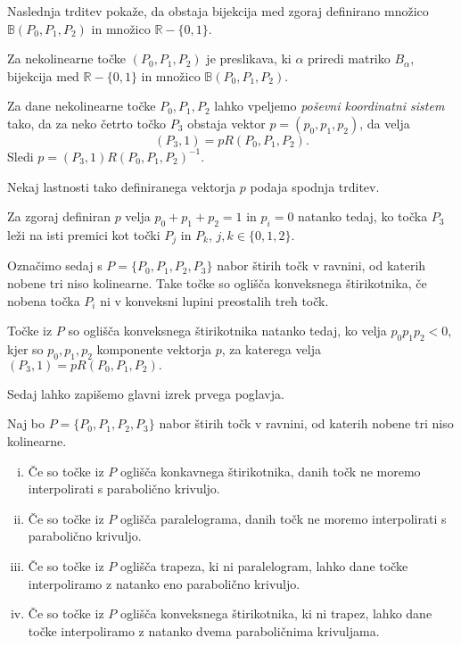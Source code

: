 \documentclass[mat1]{fmfdelo}
\newcommand{\R}{\mathbb R}
\newcommand{\B}{\mathbb B}
\newcommand{\al}{\alpha}
\begin{document}
Naslednja trditev pokaže, da obstaja bijekcija med zgoraj definirano množico $\B(P_0, P_1, P_2)$ in množico $\R - \{0, 1\}$.

\begin{trditev}
Za nekolinearne točke $(P_0, P_1, P_2)$ je preslikava, ki $\al$ priredi matriko $B_{\al}$, bijekcija med $\R - \{0, 1\}$ in množico $\B(P_0, P_1, P_2)$.
\end{trditev}

Za dane nekolinearne točke $P_0, P_1, P_2$ lahko vpeljemo \emph{poševni koordinatni sistem} tako, da za neko četrto točko $P_3$ obstaja vektor $p = (p_0, p_1, p_2)$, da velja
$$(P_3, 1) = p R(P_0, P_1, P_2).$$ Sledi $ p = (P_3, 1) R(P_0, P_1, P_2)^{-1}$.

Nekaj lastnosti tako definiranega vektorja $p$ podaja spodnja trditev.

\begin{trditev}
Za zgoraj definiran $p$ velja $p_0 + p_1 + p_2 = 1$ in $p_i = 0$ natanko tedaj, ko točka $P_3$ leži na isti premici kot točki $P_j$ in $P_k$, $j, k \in \{0, 1, 2 \}$. 
\end{trditev}

Označimo sedaj s $P = \{ P_0, P_1, P_2, P_3 \}$ nabor štirih točk v ravnini, od katerih nobene tri niso kolinearne. Take točke so oglišča konveksnega štirikotnika, če nobena točka $P_i$ ni v konveksni lupini preostalih treh točk.

\begin{trditev}
Točke iz $P$ so oglišča konveksnega štirikotnika natanko tedaj, ko velja $p_0 p_1 p_2 < 0$, kjer so $p_0, p_1, p_2$ komponente vektorja $p$, za katerega velja $(P_3, 1) = p R(P_0, P_1, P_2).$
\end{trditev}

Sedaj lahko zapišemo glavni izrek prvega poglavja.

\begin{izrek}
Naj bo $P = \{ P_0, P_1, P_2, P_3 \}$ nabor štirih točk v ravnini, od katerih nobene tri niso kolinearne.

\begin{enumerate}[i)]

\item Če so točke iz $P$ oglišča konkavnega štirikotnika, danih točk ne moremo interpolirati s parabolično krivuljo.

\item Če so točke iz $P$ oglišča paralelograma, danih točk ne moremo interpolirati s parabolično krivuljo.

\item Če so točke iz $P$ oglišča trapeza, ki ni paralelogram, lahko dane točke interpoliramo z natanko eno parabolično krivuljo.

\item Če so točke iz $P$ oglišča konveksnega štirikotnika, ki ni trapez, lahko dane točke interpoliramo z natanko dvema paraboličnima krivuljama.
\end{enumerate}

\end{izrek}
\end{document}
